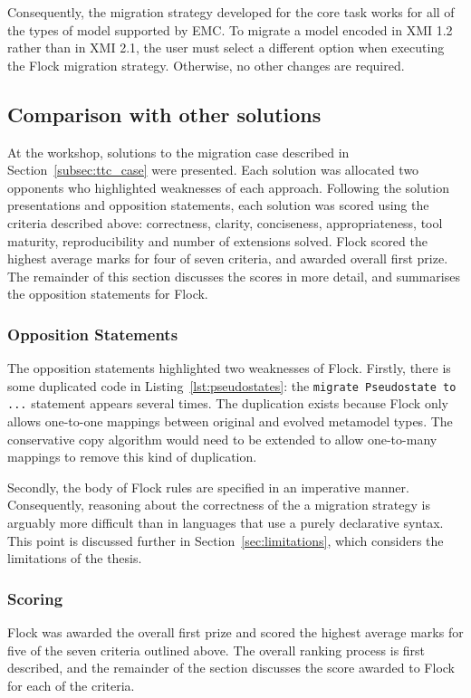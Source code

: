 Consequently, the migration strategy developed for the core task works for all of the types of model supported by EMC. To migrate a model encoded in XMI 1.2 rather than in XMI 2.1, the user must select a different option when executing the Flock migration strategy. Otherwise, no other changes are required.

\subsection{Comparison with other solutions}
At the workshop, solutions to the migration case described in Section~\ref{subsec:ttc_case} were presented. Each solution was allocated two opponents who highlighted weaknesses of each approach. Following the solution presentations and opposition statements, each solution was scored using the criteria described above: correctness, clarity, conciseness, appropriateness, tool maturity, reproducibility and number of extensions solved. Flock scored the highest average marks for four of seven criteria, and awarded overall first prize. The remainder of this section discusses the scores in more detail, and summarises the opposition statements for Flock.

\subsubsection{Opposition Statements}
The opposition statements highlighted two weaknesses of Flock. Firstly, there is some duplicated code in Listing~\ref{lst:pseudostates}: the \texttt{migrate Pseudostate to ...} statement appears several times. The duplication exists because Flock only allows one-to-one mappings between original and evolved metamodel types. The conservative copy algorithm would need to be extended to allow one-to-many mappings to remove this kind of duplication.

Secondly, the body of Flock rules are specified in an imperative manner. Consequently, reasoning about the correctness of the a migration strategy is arguably more difficult than in languages that use a purely declarative syntax. This point is discussed further in Section~\ref{sec:limitations}, which considers the limitations of the thesis.

\subsubsection{Scoring}
Flock was awarded the overall first prize and scored the highest average marks for five of the seven criteria outlined above. The overall ranking process is first described, and the remainder of the section discusses the score awarded to Flock for each of the criteria.

